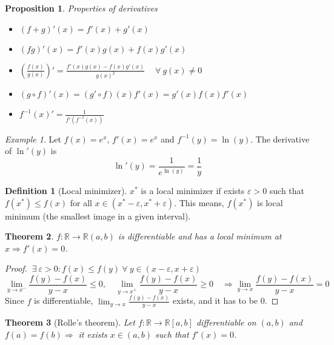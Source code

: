 \documentclass{article}
\newcommand{\DS}{\displaystyle}
\newcommand{\Ar}{\Rightarrow}
\newcommand{\fOnR}[1]{#1 : \mathbb{R} \rightarrow \mathbb{R}}
\newcommand{\intcc}[1]{\left[#1\right]}
\newcommand{\intoo}[1]{\left(#1\right)}
\theoremstyle{definition}
\newtheorem{definition}{Definition}[section]
\theoremstyle{definition}
\theoremstyle{plain}
\newtheorem{theorem}{Theorem}[section]
\theoremstyle{plain}
\theoremstyle{plain}
\theoremstyle{plain}
\newtheorem{proposition}[theorem]{Proposition}
\theoremstyle{definition}
\theoremstyle{remark}
\theoremstyle{remark}
\theoremstyle{remark}
\newtheorem{examplet}{Example}[theorem]
\theoremstyle{remark}
\newcommand{\ForAll}{\ \forall \ }
\newcommand{\Exists}{\ \exists \ }
\newcommand{\E}{\varepsilon}
\begin{document}
\begin{proposition}
  Properties of derivatives
  \begin{itemize}
  \item $(f + g)'(x) = f'(x) + g'(x)$
  \item $(fg)'(x) = f'(x)g(x) + f(x)g'(x)$
  \item $(\frac{f(x)}{g(x)})' = \frac{f'(x)g(x)-f(x)g'(x)}{g(x)^2} \quad \ForAll g(x) \neq 0$
  \item $(g \circ f)'(x) = (g' \circ f)(x)f'(x) = g'(x)f(x)f'(x)$
  \item $f^{-1}(x)' = \frac{1}{f'(f^{-1}(x))}$
  \end{itemize}
\end{proposition}

\begin{examplet}
  Let $f(x) = e^x$, $f'(x) = e^x$ and $f^{-1}(y) = \ln(y)$. The derivative of $\ln'(y)$ is
  \[
  \ln'(y) = \frac{1}{e^{\ln(y)}} = \frac{1}{y}
  \]
\end{examplet}


\begin{definition}[Local minimizer]
  $x^*$ is a local minimizer if exists $\E > 0$ such that $f(x^*) \leq f(x)$ for all $x \in \intoo{x^*-\E, x^*+\E}$. This means, $f(x^*)$ is local minimum (the smallest image in a given interval).
\end{definition}


\begin{theorem}
  $\fOnR{f}{\intoo{a,b}}$ is differentiable and has a local minimum at $x \Ar f'(x) = 0$.
\end{theorem}

\begin{proof}
  $\Exists \E > 0 : f(x) \leq f(y) \ForAll y \in \intoo{x-\E,x+\E}$
  \[
  \lim_{y \to x^-} \frac{f(y)-f(x)}{y-x} \leq 0, \quad
  \lim_{y \to x^+} \frac{f(y)-f(x)}{y-x} \geq 0 \quad \Ar
  \lim_{y \to x} \frac{f(y)-f(x)}{y-x} = 0
  \]
  Since $f$ is differentiable, $\DS \lim_{y \to x}\frac{f(y)-f(x)}{y-x}$ exists, and it has to be 0.
\end{proof}


\begin{theorem}[Rolle's theorem]
  Let $\fOnR{f}{\intcc{a,b}}$ differentiable on $\intoo{a,b}$ and $f(a) = f(b) \Ar$ it exists $x \in \intoo{a,b}$ such that $f'(x) = 0$.
\end{theorem}
\end{document}
